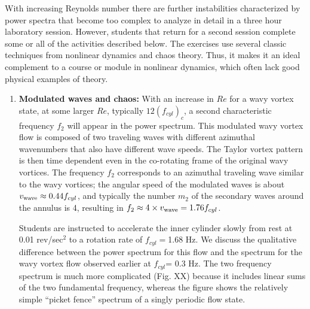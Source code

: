 \documentclass[%
 amsmath,amssymb,
 aps,
floatfix,
aps,prd,longbibliography,
notitlepage
]{revtex4-1}
\begin{document}
With increasing Reynolds number there are further instabilities characterized by power spectra that become too complex to analyze in detail in a three hour laboratory session.  However, students that return for a second session complete some or all of the activities described below. The exercises use several classic techniques from nonlinear dynamics and chaos theory. Thus, it makes it an ideal complement to a course or module in nonlinear dynamics, which often lack good physical examples of theory.

\begin{enumerate}

\item \textbf{Modulated waves and chaos:} With an increase in $Re$ for a wavy vortex state, at some larger $Re$, typically $12( f_{cyl})_c$, a second characteristic frequency $f_2$ will appear in the power spectrum. This modulated wavy vortex flow is composed of two traveling waves with different azimuthal wavenumbers that also have different wave speeds. The Taylor vortex pattern is then time dependent even in the co-rotating frame of the original wavy vortices.  The frequency $f_2$ corresponds to an azimuthal traveling wave similar to the wavy vortices; the angular speed of the modulated waves is about $v_{\rm wave}\approx0.44f_{cyl}$, and typically the number $m_2$ of the secondary waves around the annulus is 4, resulting in $f_2 \approx 4\times v_{\rm wave}= 1.76 f_{cyl}$.  

Students are instructed to accelerate the inner cylinder slowly from rest at 0.01 rev/sec$^2$ to a rotation rate of $f_{cyl}=$1.68 Hz. We discuss the qualitative difference between the power spectrum for this flow and the spectrum for the wavy vortex flow observed earlier at $f_{cyl}$= 0.3 Hz. The two frequency spectrum is much more complicated (Fig. XX) because it includes linear sums of the two fundamental frequency, whereas the figure shows the relatively simple ``picket fence'' spectrum of a singly periodic flow state. 




\end{enumerate}
\end{document}
